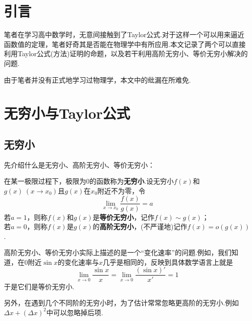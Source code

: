 
\iffalse
\fi


\chapter{引言}

笔者在学习高中数学时，无意间接触到了Taylor公式.对于这样一个可以用来逼近函数值的定理，笔者好奇其是否能在物理学中有所应用.本文记录了两个可以直接利用Taylor公式(方法)证明的命题，以及若干利用高阶无穷小、等价无穷小解决的问题.

由于笔者并没有正式地学习过物理学，本文中的纰漏在所难免.

\chapter{无穷小与Taylor公式}

\section{无穷小}

先介绍什么是无穷小、高阶无穷小、等价无穷小：

\begin{definition}
	在某一极限过程下，极限为$0$的函数称为\textbf{无穷小}.设无穷小$f(x)$和$g(x)~(x \to x_0)$且$g(x)$在$x_0$附近不为零，令$$\lim_{x \to x_0} \frac{f(x)}{g(x)}=a$$
	若$a=1$，则称$f(x)$和$g(x)$是\textbf{等价无穷小}，记作$f(x) \sim g(x)$； \\
	若$a=0$，则称$f(x)$是$g(x)$的\textbf{高阶无穷小}，(不严谨地)记作$f(x)=o(g(x))$.
\end{definition}

高阶无穷小、等价无穷小实际上描述的是一个“变化速率”的问题.例如，我们知道，在$0$附近$\sin x$的变化速率与$x$几乎是相同的，反映到具体数学语言上就是$$\lim_{x \to 0} \frac{\sin x}{x} = \lim_{x \to 0} \frac{(\sin x)'}{x'} = 1$$
	于是它们是等价无穷小. 

另外，在遇到几个不同阶的无穷小时，为了估计常常忽略更高阶的无穷小.例如$\Delta x+(\Delta x)^2$中可以忽略掉后项.



